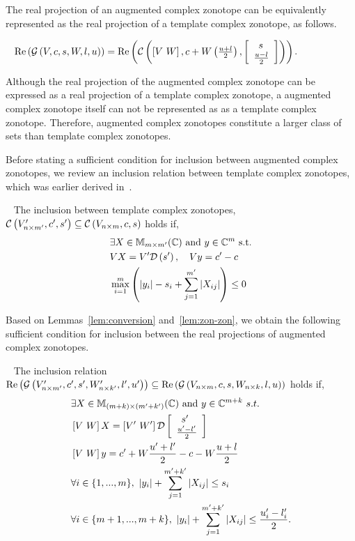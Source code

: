 


The real projection of an augmented complex zonotope can be
equivalently represented as the real projection of a template complex
zonotope, as follows.  
\begin{lemma}~\label{lem:conversion}
$\real\lt(\gcz{V}{c}{s}{W}{l}{u}\rt) = \real\lt(\cz{\lt[V~W\rt]}{c+W\lt(\frac{u+l}{2}\rt)}{\ColumnJoin{\hspace{0.5em}s}{\frac{u-l}{2}}}\rt)$.
\end{lemma}
Although the real projection of the augmented complex zonotope can
be expressed as a real projection of a template complex zonotope, a
augmented complex zonotope itself can not be represented as as a
template complex zonotope.  Therefore, augmented complex zonotopes
constitute a larger class of sets than template complex zonotopes.

Before stating a sufficient condition for inclusion between augmented complex
zonotopes, we review an inclusion relation between template complex
zonotopes, which was earlier derived in~\cite{todo}.
\begin{lemma}~\label{lem:zon-zon} The inclusion between template complex zonotopes,
  $\cz{V^\pr_{n\times m^\pr}}{c^\pr}{s^\pr}\subseteq \cz{V_{n\times m}}{c}{s}$ holds if,
\begin{align}
\begin{split}
& \exists X\in\mat{m}{m^\pr}{\mb{C}}~\text{and}~y\in\mb{C}^{m}~\text{s.t.}\\
& \transfer{V}{V^\pr}{s^\pr}{X},~~~\centertransfer{V}{c}{c^\pr}{y}\\
& \scalebound{X}{y}{s}{m}{m^\pr}\leq 0\\
\end{split}
\end{align}
\end{lemma}

Based on Lemmas~\ref{lem:conversion} and~\ref{lem:zon-zon}, we obtain
the following sufficient condition for inclusion between the real
projections of augmented complex zonotopes.
\begin{lemma}~\label{lem:gcz-gcz}
The inclusion relation
$\real\lt(\gcz{V^\pr_{n\times m^\pr}}{c^\pr}{s^\pr}{W^\pr_{n\times k^\pr}}{l^\pr}{u^\pr}\rt)\subseteq
\real\lt(\gcz{V_{n\times m}}{c}{s}{W_{n\times k}}{l}{u}\rt)$ holds if,
\begin{align}
\begin{split}
& \exists X\in\mat{(m+k)}{(m^\pr+k^\pr)}{\mb{C}}~\text{and}~y\in\mb{C}^{m+k}~s.t.\\
& \lt[V~W\rt]X = \lt[V^\pr~W^\pr\rt]\dg\ColumnJoin{\hspace{0.5em}s^\pr}{\frac{u^\pr-l^\pr}{2}}\\
& \lt[V~W\rt]y = c^\pr+W\frac{u^\pr+l^\pr}{2}-c-W\frac{u+l}{2}\\
& \forall i\in\tup{m},~|y_i|+\sum_{j=1}^{m^\pr+k^\pr}\lt|X_{ij}\rt|\leq s_i\\
& \forall i\in\{m+1,...,m+k\},~|y_i|+\sum_{j=1}^{m^\pr+k^\pr}\lt|X_{ij}\rt|\leq \frac{u^\pr_i-l^\pr_i}{2}.
\end{split}
\end{align}
\end{lemma}

